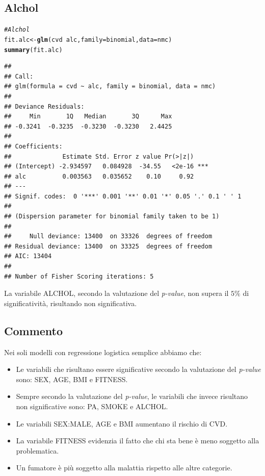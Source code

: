 \documentclass{article}\usepackage[]{graphicx}\usepackage[]{xcolor}
\makeatletter
\newcommand{\hlcom}[1]{\textcolor[rgb]{0.678,0.584,0.686}{\textit{#1}}}%
\newcommand{\hlopt}[1]{\textcolor[rgb]{0,0,0}{#1}}%
\newcommand{\hlstd}[1]{\textcolor[rgb]{0.345,0.345,0.345}{#1}}%
\newcommand{\hlkwb}[1]{\textcolor[rgb]{0.69,0.353,0.396}{#1}}%
\newcommand{\hlkwc}[1]{\textcolor[rgb]{0.333,0.667,0.333}{#1}}%
\newcommand{\hlkwd}[1]{\textcolor[rgb]{0.737,0.353,0.396}{\textbf{#1}}}%
\newenvironment{kframe}{%
 \def\at@end@of@kframe{}%
 \ifinner\ifhmode%
  \def\at@end@of@kframe{\end{minipage}}%
  \begin{minipage}{\columnwidth}%
 \fi\fi%
 \def\FrameCommand##1{\hskip\@totalleftmargin \hskip-\fboxsep
 \colorbox{shadecolor}{##1}\hskip-\fboxsep
     \hskip-\linewidth \hskip-\@totalleftmargin \hskip\columnwidth}%
 \MakeFramed {\advance\hsize-\width
   \@totalleftmargin\z@ \linewidth\hsize
   \@setminipage}}%
 {\par\unskip\endMakeFramed%
 \at@end@of@kframe}
\newenvironment{knitrout}{}{} %
\makeatother
\begin{document}
  \clearpage  
    
  \subsection{Alchol}
\begin{knitrout}
\color{fgcolor}\begin{kframe}
\begin{alltt}
\hlcom{#Alchol}
\hlstd{fit.alc} \hlkwb{<-} \hlkwd{glm}\hlstd{(cvd}\hlopt{~}\hlstd{alc,} \hlkwc{family}\hlstd{=binomial,} \hlkwc{data}\hlstd{=nmc)}
\hlkwd{summary}\hlstd{(fit.alc)}
\end{alltt}
\begin{verbatim}
## 
## Call:
## glm(formula = cvd ~ alc, family = binomial, data = nmc)
## 
## Deviance Residuals: 
##     Min       1Q   Median       3Q      Max  
## -0.3241  -0.3235  -0.3230  -0.3230   2.4425  
## 
## Coefficients:
##              Estimate Std. Error z value Pr(>|z|)    
## (Intercept) -2.934597   0.084928  -34.55   <2e-16 ***
## alc          0.003563   0.035652    0.10     0.92    
## ---
## Signif. codes:  0 '***' 0.001 '**' 0.01 '*' 0.05 '.' 0.1 ' ' 1
## 
## (Dispersion parameter for binomial family taken to be 1)
## 
##     Null deviance: 13400  on 33326  degrees of freedom
## Residual deviance: 13400  on 33325  degrees of freedom
## AIC: 13404
## 
## Number of Fisher Scoring iterations: 5
\end{verbatim}
\end{kframe}
\end{knitrout}
    
    La variabile ALCHOL, secondo la valutazione del \emph{p-value}, non supera
    il $5\%$ di significatività, risultando non significativa.
  
  \subsection{Commento}
    Nei soli modelli con regressione logistica semplice abbiamo che:
    \begin{itemize}
      \item Le variabili che risultano essere significative secondo la valutazione
            del \emph{p-value} sono: SEX, AGE, BMI e FITNESS.
      \item Sempre secondo la valutazione del \emph{p-value}, le variabili che 
            invece risultano non significative sono: PA, SMOKE e ALCHOL.
      \item Le variabili SEX:MALE, AGE e BMI aumentano il rischio di CVD.
      \item La variabile FITNESS evidenzia il fatto che chi sta bene è meno
            soggetto alla problematica.
      \item Un fumatore è più soggetto alla malattia rispetto alle altre categorie.
    \end{itemize}
  
\end{document}
